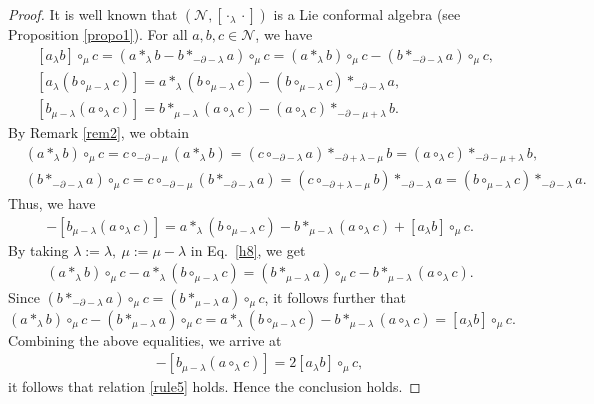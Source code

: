 \documentclass[11pt,letterpaper,reqno]{amsart}
\theoremstyle{definition}
\numberwithin{equation}{section}
\begin{document}
\begin{proof}
   It is well known that $(\mathcal{N},[\cdot_\lambda\cdot])$ is a Lie conformal algebra (see Proposition \ref{propo1}). For all $a,b,c\in \mathcal{N}$, we have
   \begin{align*}
      &[a_{\lambda}b]\circ_{\mu}c=(a\ast_{\lambda} b-b\ast_{-\partial-\lambda} a)\circ_{\mu}c=(a\ast_{\lambda} b)\circ_{\mu}c-(b\ast_{-\partial-\lambda} a)\circ_{\mu}c, \\
      &[a_{{\lambda}}(b\circ_{\mu-\lambda}c)]=a\ast_{\lambda} (b\circ_{\mu-\lambda}c)-(b\circ_{\mu-\lambda}c)\ast_{-\partial-\lambda} a, \\
      &[b_{\mu-\lambda}(a\circ_{\lambda}c)]=b\ast_{\mu-\lambda} (a\circ_{\lambda}c)-(a\circ_{\lambda}c)\ast_{-\partial-\mu+\lambda} b.
   \end{align*}
   By Remark \ref{rem2}, we obtain
   \begin{align*}
      &(a\ast_{\lambda} b)\circ_{\mu}c=c\circ_{-\partial-\mu}(a\ast_{\lambda} b)=(c\circ_{-\partial-\lambda}a)\ast_{-\partial+\lambda-\mu}b=(a\circ_{\lambda}c)\ast_{-\partial-\mu+\lambda} b, \\
      &(b\ast_{-\partial-\lambda} a)\circ_{\mu}c=c\circ_{-\partial-\mu}(b\ast_{-\partial-\lambda} a)=(c\circ_{-\partial+\lambda-\mu}b)\ast_{-\partial-\lambda}a=(b\circ_{\mu-\lambda}c)\ast_{-\partial-\lambda}a.
   \end{align*}
   Thus, we have
   \begin{align*}
      [a_{{\lambda}}(b\circ_{\mu-\lambda}c)]-[b_{\mu-\lambda}(a\circ_{\lambda}c)]=a\ast_{\lambda} (b\circ_{\mu-\lambda}c)-b\ast_{\mu-\lambda} (a\circ_{\lambda}c)+[a_{\lambda}b]\circ_{\mu}c.
   \end{align*}
   By taking $\lambda:=\lambda,~\mu:=\mu-\lambda$ in Eq.~\eqref{h8}, we get
   \begin{align*}
      (a\ast_\lambda b)\circ_{\mu}c-a\ast_\lambda(b\circ_{\mu-\lambda} c)=(b\ast_{\mu-\lambda} a)\circ_{\mu}c-b\ast_{\mu-\lambda}(a\circ_\lambda c).
   \end{align*}
   Since $(b\ast_{-\partial-\lambda} a)\circ_{\mu}c=(b\ast_{\mu-\lambda} a)\circ_{\mu}c$, it follows further that
   $$(a\ast_\lambda b)\circ_{\mu}c-(b\ast_{\mu-\lambda} a)\circ_{\mu}c=a\ast_\lambda(b\circ_{\mu-\lambda} c)-b\ast_{\mu-\lambda}(a\circ_\lambda c)=[a_{\lambda}b]\circ_{\mu}c.$$
   Combining the above equalities, we arrive at
   \begin{align*}
      [a_{{\lambda}}(b\circ_{\mu-\lambda}c)]-[b_{\mu-\lambda}(a\circ_{\lambda}c)]=2[a_{\lambda}b]\circ_{\mu}c,
   \end{align*}
   it follows that relation \eqref{rule5} holds. Hence the conclusion holds.
\end{proof}
\end{document}
